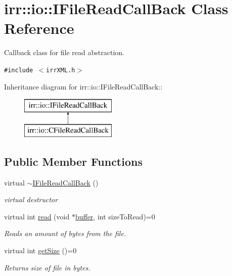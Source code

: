 \hypertarget{classirr_1_1io_1_1_i_file_read_call_back}{
\section{irr::io::IFileReadCallBack Class Reference}
\label{classirr_1_1io_1_1_i_file_read_call_back}
}
Callback class for file read abstraction.  


{\tt \#include $<$irrXML.h$>$}

Inheritance diagram for irr::io::IFileReadCallBack::\begin{figure}[H]
\begin{center}
\leavevmode
\includegraphics[height=2cm]{classirr_1_1io_1_1_i_file_read_call_back}
\end{center}
\end{figure}
\subsection*{Public Member Functions}
\begin{CompactItemize}
\item 
virtual \hyperlink{classirr_1_1io_1_1_i_file_read_call_back_91ace84f0a3966d88d78da5342eb9619}{$\sim$IFileReadCallBack} ()
\begin{CompactList}\small\item\em virtual destructor \item\end{CompactList}\item 
virtual int \hyperlink{classirr_1_1io_1_1_i_file_read_call_back_e8c57b8454078aa2acd39772a6aa4439}{read} (void $\ast$\hyperlink{glext__bak_8h_c4fdb15bdbcd63430bab668b5419ed9f}{buffer}, int sizeToRead)=0
\begin{CompactList}\small\item\em Reads an amount of bytes from the file. \item\end{CompactList}\item 
virtual int \hyperlink{classirr_1_1io_1_1_i_file_read_call_back_51e3ae6f16cf3058800cb905f3b21b23}{getSize} ()=0
\begin{CompactList}\small\item\em Returns size of file in bytes. \item\end{CompactList}\end{CompactItemize}


